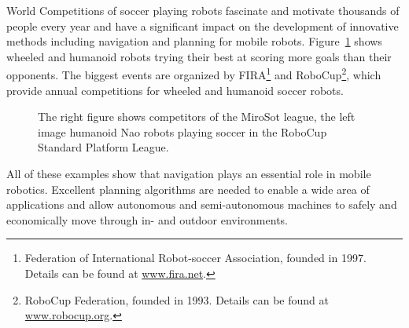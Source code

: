 \begin{description}
World Competitions of soccer playing robots fascinate and motivate thousands of people every year and have a significant impact on the development of innovative methods including navigation and planning for mobile robots.
Figure~\ref{fig:fig_competition} shows wheeled and humanoid robots trying their best at scoring more goals than their opponents.
The biggest events are organized by FIRA\footnote{Federation of International Robot-soccer Association, founded in 1997. Details can be found at \url{www.fira.net}.} and RoboCup\footnote{RoboCup Federation, founded in 1993. Details can be found at \url{www.robocup.org}.}, which provide annual competitions for wheeled and humanoid soccer robots.

\begin{figure}[thpb]
	  \myfloatalign
      \footnotesize
      \centering
   \caption[Soccer robots]{The right figure shows competitors of the MiroSot league, the left image humanoid Nao robots playing soccer in the RoboCup Standard Platform League.}
   \label{fig:fig_competition}
\end{figure}
\end{description}

All of these examples show that navigation plays an essential role in mobile robotics. Excellent planning algorithms are needed to enable a wide area of applications and allow autonomous and semi-autonomous machines to safely and economically move through in- and outdoor environments.


